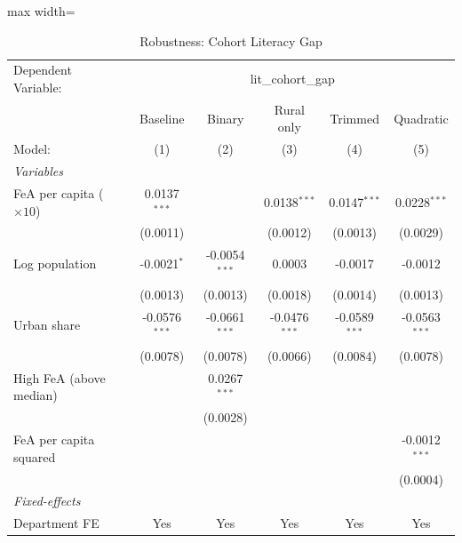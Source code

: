 
\begin{table}[htbp]
   \caption{\label{tab:robust} Robustness: Cohort Literacy Gap}
   \centering
   \begin{adjustbox}{max width=\textwidth}\begin{tabular}{lccccc}
      \tabularnewline \midrule \midrule
      Dependent Variable: & \multicolumn{5}{c}{lit\_cohort\_gap}\\
                                    & Baseline        & Binary          & Rural only      & Trimmed         & Quadratic \\   
      Model:                        & (1)             & (2)             & (3)             & (4)             & (5)\\  
      \midrule
      \emph{Variables}\\
      FeA per capita ($\times 10$)  & 0.0137$^{***}$  &                 & 0.0138$^{***}$  & 0.0147$^{***}$  & 0.0228$^{***}$\\   
                                    & (0.0011)        &                 & (0.0012)        & (0.0013)        & (0.0029)\\   
      Log population                & -0.0021$^{*}$   & -0.0054$^{***}$ & 0.0003          & -0.0017         & -0.0012\\   
                                    & (0.0013)        & (0.0013)        & (0.0018)        & (0.0014)        & (0.0013)\\   
      Urban share                   & -0.0576$^{***}$ & -0.0661$^{***}$ & -0.0476$^{***}$ & -0.0589$^{***}$ & -0.0563$^{***}$\\   
                                    & (0.0078)        & (0.0078)        & (0.0066)        & (0.0084)        & (0.0078)\\   
      High FeA (above median)       &                 & 0.0267$^{***}$  &                 &                 &   \\   
                                    &                 & (0.0028)        &                 &                 &   \\   
      FeA per capita squared        &                 &                 &                 &                 & -0.0012$^{***}$\\   
                                    &                 &                 &                 &                 & (0.0004)\\   
      \midrule
      \emph{Fixed-effects}\\
      Department FE                 & Yes             & Yes             & Yes             & Yes             & Yes\\  

\end{tabular}
\end{adjustbox}
\end{table}
